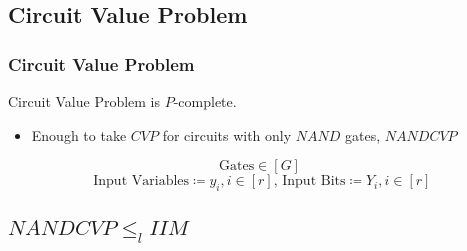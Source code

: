 \documentclass[article,10pt]{beamer}%
\begin{document}
\subsection{Circuit Value Problem}


\begin{frame}
\frametitle{Circuit Value Problem}
\begin{theorem}
	Circuit Value Problem is $P$-complete.
\end{theorem}
\vspace{5mm}


\begin{itemize}
	\item Enough to take $CVP$ for circuits with only $NAND$ gates, $NANDCVP$
\end{itemize}
$$\text{Gates$\in [G]$}$$ $$\text{ Input Variables$\coloneqq y_i,i\in[r]$, Input Bits$\coloneqq Y_i,i\in[r]$} $$ 



\end{frame}

\subsection{$NANDCVP\leq_l IIM$}
\end{document}

